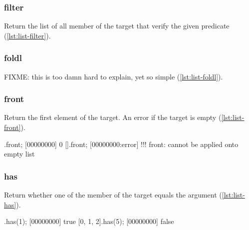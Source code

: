 \subsubsection{filter}

Return the list of all member of the target that verify the given
predicate (\autoref{lst:list-filter}).


\subsubsection{foldl}

FIXME: this is too damn hard to explain, yet so simple
(\autoref{lst:list-foldl}).

\begin{urbiscript}[caption=List.foldl, label=lst:list-foldl, float=\floatposh]

\end{urbiscript}

\subsubsection{front}
\label{sec:std-list-front}

Return the first element of the target. An error if the target is
empty (\autoref{lst:list-front}).

\begin{urbiscript}[caption=List.front, label=lst:list-front, float=\floatposh]
  [0, 1, 2].front;
  [00000000] 0
  [].front;
  [00000000:error] !!! front: cannot be applied onto empty list
\end{urbiscript}

\subsubsection{has}

Return whether one of the member of the target equals the argument
(\autoref{lst:list-has}).

\begin{urbiscript}[caption=List.has, label=lst:list-has, float=\floatposh]
  [0, 1, 2].has(1);
  [00000000] true
  [0, 1, 2].has(5);
  [00000000] false
\end{urbiscript}

